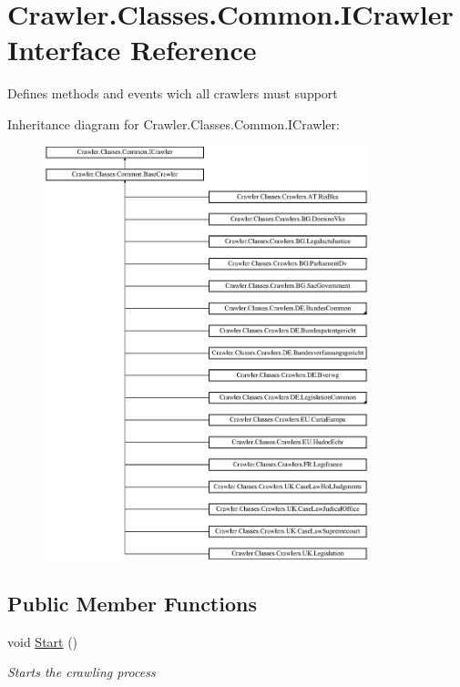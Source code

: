 \hypertarget{interface_crawler_1_1_classes_1_1_common_1_1_i_crawler}{\section{Crawler.\-Classes.\-Common.\-I\-Crawler Interface Reference}
\label{interface_crawler_1_1_classes_1_1_common_1_1_i_crawler}
}


Defines methods and events wich all crawlers must support  


Inheritance diagram for Crawler.\-Classes.\-Common.\-I\-Crawler\-:\begin{figure}[H]
\begin{center}
\leavevmode
\includegraphics[height=12.000000cm]{interface_crawler_1_1_classes_1_1_common_1_1_i_crawler}
\end{center}
\end{figure}
\subsection*{Public Member Functions}
\begin{DoxyCompactItemize}
\item 
void \hyperlink{interface_crawler_1_1_classes_1_1_common_1_1_i_crawler_a5fabe437ecf6f494c75d6c79487b63ab}{Start} ()
\begin{DoxyCompactList}\small\item\em Starts the crawling process \end{DoxyCompactList}\end{DoxyCompactItemize}
